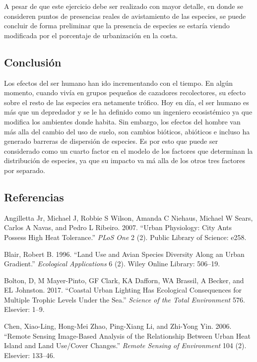\documentclass[]{article}
\begin{document}
A pesar de que este ejercicio debe ser realizado con mayor detalle, en
donde se consideren puntos de presencias reales de avistamiento de las
especies, se puede concluir de forma preliminar que la presencia de
especies se estaría viendo modificada por el porcentaje de urbanización
en la costa.

\subsection{Conclusión}\label{conclusion}

Los efectos del ser humano han ido incrementando con el tiempo. En algún
momento, cuando vivía en grupos pequeños de cazadores recolectores, su
efecto sobre el resto de las especies era netamente trófico. Hoy en día,
el ser humano es más que un depredador y se le ha definido como un
ingeniero ecosistémico ya que modifica los ambientes donde habita. Sin
embargo, los efectos del hombre van más alla del cambio del uso de
suelo, son cambios bióticos, abióticos e incluso ha generado barreras de
dispersión de especies. Es por esto que puede ser considerado como un
cuarto factor en el modelo de los factores que determinan la
distribución de especies, ya que su impacto va má alla de los otros tres
factores por separado.

\subsection*{Referencias}\label{referencias}

\hypertarget{refs}{}
\hypertarget{ref-angilletta2007urban}{}
Angilletta Jr, Michael J, Robbie S Wilson, Amanda C Niehaus, Michael W
Sears, Carlos A Navas, and Pedro L Ribeiro. 2007. ``Urban Physiology:
City Ants Possess High Heat Tolerance.'' \emph{PLoS One} 2 (2). Public
Library of Science: e258.

\hypertarget{ref-blair1996land}{}
Blair, Robert B. 1996. ``Land Use and Avian Species Diversity Along an
Urban Gradient.'' \emph{Ecological Applications} 6 (2). Wiley Online
Library: 506--19.

\hypertarget{ref-bolton2017coastal}{}
Bolton, D, M Mayer-Pinto, GF Clark, KA Dafforn, WA Brassil, A Becker,
and EL Johnston. 2017. ``Coastal Urban Lighting Has Ecological
Consequences for Multiple Trophic Levels Under the Sea.'' \emph{Science
of the Total Environment} 576. Elsevier: 1--9.

\hypertarget{ref-chen2006remote}{}
Chen, Xiao-Ling, Hong-Mei Zhao, Ping-Xiang Li, and Zhi-Yong Yin. 2006.
``Remote Sensing Image-Based Analysis of the Relationship Between Urban
Heat Island and Land Use/Cover Changes.'' \emph{Remote Sensing of
Environment} 104 (2). Elsevier: 133--46.
\end{document}
